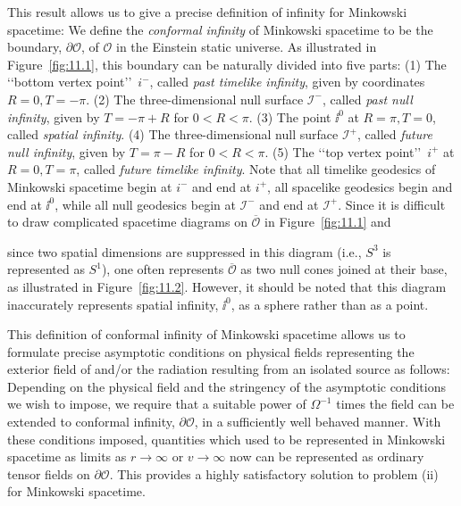 This result allows us to give a precise definition of infinity for Minkowski
spacetime: We define the \emph{conformal infinity} of Minkowski spacetime to be the
boundary, \(\partial\mathcal O\), of \(\mathcal O\) in the Einstein static universe. As
illustrated in Figure~\ref{fig:11.1}, this boundary can be naturally divided into five
parts: (1) The \lq\lq bottom vertex point\rq\rq\ \(i^-\), called \emph{past timelike
infinity}, given by coordinates \(R=0,T=-\pi\). (2) The three-dimensional null
surface \(\mathcal I^-\), called \emph{past null infinity}, given by \(T=-\pi+R\) for
\(0<R<\pi\). (3) The point \(\ii^0\) at \(R=\pi,T=0\), called \emph{spatial infinity}.
(4) The three-dimensional null surface \(\mathcal I^+\), called \emph{future null
infinity}, given by \(T=\pi-R\) for \(0<R<\pi\). (5) The \lq\lq top vertex point\rq\rq\
\(i^+\) at \(R=0,T=\pi\), called \emph{future timelike infinity}. Note that all
timelike geodesics of Minkowski spacetime begin at \(i^-\) and end at \(i^+\), all
spacelike geodesics begin and end at \(\ii^0\), while all null geodesics begin at
\(\mathcal I^-\) and end at \(\mathcal I^+\). Since it is difficult to draw complicated
spacetime diagrams on \(\overline{\mathcal O}\) in Figure~\ref{fig:11.1} and



since two
spatial dimensions are suppressed in this diagram (i.e., \(S^3\) is represented as
\(S^1\)), one often represents \(\overline{\mathcal O}\) as two null cones joined at
their base, as illustrated in Figure~\ref{fig:11.2}. However, it should be noted that
this diagram inaccurately represents spatial infinity, \(\ii^0\), as a sphere rather than
as a point.

This definition of conformal infinity of Minkowski spacetime allows us to formulate
precise asymptotic conditions on physical fields representing the exterior field of
and/or the radiation resulting from an isolated source as follows: Depending on the
physical field and the stringency of the asymptotic conditions we wish to impose, we
require that a suitable power of \(\Omega^{-1}\) times the field can be extended to
conformal infinity, \(\partial\mathcal O\), in a sufficiently well behaved manner.
With these conditions imposed, quantities which used to be represented in Minkowski
spacetime as limits as \(r\to\infty\) or \(v\to\infty\) now can be represented as
ordinary tensor fields on \(\partial\mathcal O\). This provides a highly satisfactory
solution to problem (ii) for Minkowski spacetime.


